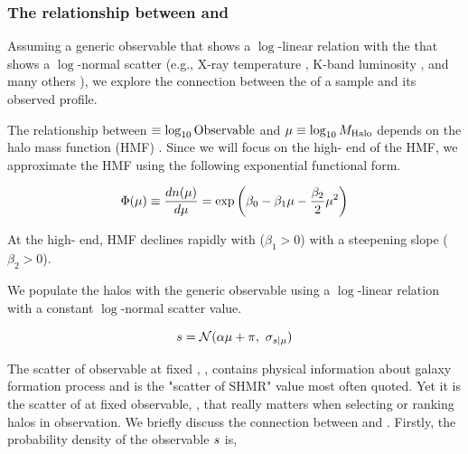 \documentclass[fleqn,usenatbib,useAMS,english]{mnras}
\begin{document}
\subsubsection{The relationship between \scatterMhaloObsSym{} and \scatterObsSymMhalo{}}
    \label{sec:comp_scatters}

    Assuming a generic observable that shows a $\log$-linear relation with the \mvir{} that shows
    a $\log$-normal scatter (e.g.,
    X-ray temperature \citealt{Lieu2016}, K-band luminosity \citealt{Ziparo2016}, and many others
    \citealt{Evrard2014, Farahi2018}), we explore the connection between the \sigmh{} of a sample
    and its observed \dsigma{} profile.

    The relationship between \obsSym{}$\equiv \log_{10}{\rm Observable}$ and
    $\mu \equiv \log_{10}M_{\rm Halo}$ depends on the halo mass function (HMF)
    \citep[\eg{}][]{Tinker2008}.
    Since we will focus on the high-\mhalo{} end of the HMF, we approximate the HMF using the
    following exponential functional form.

    \begin{equation}
        \Phi(\mu){} \equiv \frac{dn(\mu)}{d\mu{}}  = \exp \left(\beta_0 - \beta_1 \mu - \frac{\beta_2}{2} \mu^2 \right)
        \label{eq:quadratic_hmf}
    \end{equation}

    \noindent At the high-\mhalo{} end, HMF declines rapidly with \mhalo{} ($\beta_1 > 0$) with a
    steepening slope ($\beta_2 > 0$).

    We populate the halos with the generic observable using a $\log$-linear relation with a
    constant $\log$-normal scatter value.

    \begin{equation}
        s = \mathcal{N}(\alpha \mu + \pi,\ \sigma_{s{} | \mu{}})
        \label{eq:lognormal_obs_given_mhalo}
    \end{equation}

    The scatter of observable at fixed \mhalo{}, \scatterObsSymMhalo{}, contains physical
    information about galaxy formation process and is the "scatter of SHMR" value most often
    quoted.
    Yet it is the scatter of \mhalo{} at fixed observable, \scatterMhaloObsSym{}, that really
    matters when selecting or ranking halos in observation.
    We briefly discuss the connection between \scatterObsSymMhalo{} and \scatterObsSymMhalo{}.
    Firstly, the probability density of the observable $s$ is,
\end{document}
